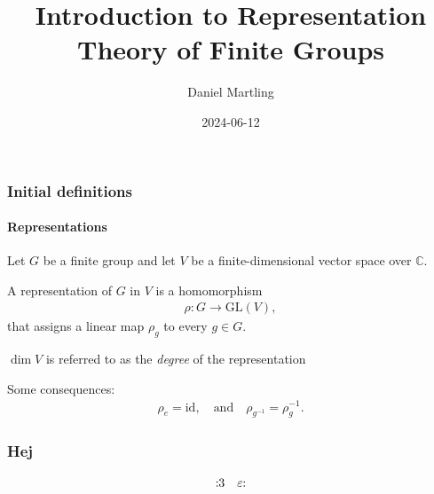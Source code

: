 \documentclass[12pt]{beamer}
\begin{document}
	\author{Daniel Martling}
	\title{Introduction to Representation Theory of Finite Groups}
	\date{2024-06-12}
	\begin{frame}[plain]
		\maketitle
	\end{frame}
	
	\begin{frame}[plain]
		\frametitle{Initial definitions}
		\framesubtitle{Representations}
		Let $G$ be a finite group and let $V$ be a finite-dimensional vector space over $\mathbb{C}$. \pause
		
		\begin{definition}
			A representation of $G$ in $V$ is a homomorphism
			\begin{align*}
				\rho : G \rightarrow \text{GL} (V),
			\end{align*}
			that assigns a linear map $\rho_g$ to every $g \in G$.
		\end{definition} \pause
		
		\begin{definition}
			$\dim V$ is referred to as the \textit{degree} of the representation 
		\end{definition} \pause
		
		Some consequences:
		\begin{align*}
			\rho_e = \text{id}, \quad \text{and} \quad \rho_{g^{-1}} = \rho_g^{-1}.
		\end{align*}
		
		
		
	\end{frame}
	
	\begin{frame}
		\frametitle{Hej}
		\begin{align*}
			:\hspace{-3pt}3 \quad
			\varepsilon\hspace{-3pt}: 
		\end{align*}
		
		
	\end{frame}
\end{document}
